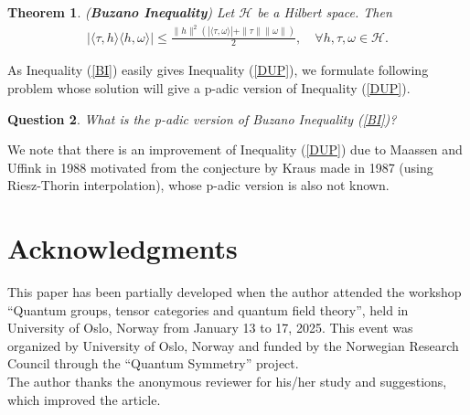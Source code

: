\documentclass{amsart}
\newtheorem{theorem}{Theorem}[section]
\newtheorem{question}[theorem]{Question}
\begin{document}
\begin{theorem}  \cite{FUJIIKUBO, BUZANO, STEELE} \label{BT}   (\textbf{Buzano Inequality})
	Let $\mathcal{H}$ be a Hilbert space. Then 
	\begin{align}\label{BI}
		|\langle \tau, h\rangle \langle h, \omega\rangle |\leq \frac{\|h\|^2(|\langle \tau, \omega \rangle|+\|\tau\|\|\omega\|)}{2}, \quad \forall h, \tau, \omega \in \mathcal{H}.
	\end{align}
\end{theorem} 
As  Inequality (\ref{BI}) easily gives Inequality (\ref{DUP}), we formulate following problem whose solution will give a p-adic version of Inequality (\ref{DUP}).
\begin{question}
		What is the p-adic version of Buzano Inequality (\ref{BI})?
\end{question}
We note that there is an improvement of Inequality (\ref{DUP}) due to Maassen and Uffink in 1988 \cite{MAASSENUFFINK} motivated from the conjecture by Kraus \cite{KRAUS} made in 1987 (using Riesz-Thorin interpolation), whose p-adic version is also not known. 

\section{Acknowledgments}
This paper has been partially developed when the author attended the workshop “Quantum groups, tensor categories and quantum field theory”, held in University of Oslo, Norway from January 13 to 17, 2025. This event was organized by University of Oslo, Norway and funded by the Norwegian Research Council through the “Quantum Symmetry” project.\\
The author thanks the anonymous reviewer for his/her study and  suggestions, which
improved the article.

















 
 
 
 
\end{document}
